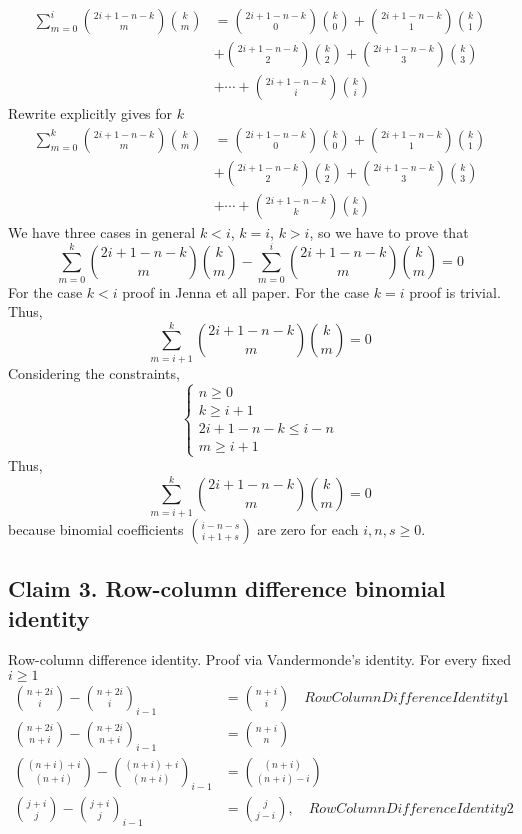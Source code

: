 \documentclass[12pt,letterpaper,oneside,reqno]{amsart}
\newcommand \rascalNumber [3] {\binom{#1}{#2}_{#3}}
\numberwithin{equation}{section}
\begin{document}
\begin{align*}
    \sum_{m=0}^{i} \binom{2i+1-n-k}{m} \binom{k}{m} &= \binom{2i+1-n-k}{0} \binom{k}{0} + \binom{2i+1-n-k}{1} \binom{k}{1} \\
    &+ \binom{2i+1-n-k}{2} \binom{k}{2} + \binom{2i+1-n-k}{3} \binom{k}{3} \\
    &+ \cdots + \binom{2i+1-n-k}{i} \binom{k}{i}
\end{align*}
Rewrite explicitly gives for $k$
\begin{align*}
    \sum_{m=0}^{k} \binom{2i+1-n-k}{m} \binom{k}{m} &= \binom{2i+1-n-k}{0} \binom{k}{0} + \binom{2i+1-n-k}{1} \binom{k}{1} \\
    &+ \binom{2i+1-n-k}{2} \binom{k}{2} + \binom{2i+1-n-k}{3} \binom{k}{3} \\
    &+ \cdots + \binom{2i+1-n-k}{k} \binom{k}{k}
\end{align*}
We have three cases in general $k < i$, $k=i$, $k > i$, so we have to prove that
\begin{equation*}
    \sum_{m=0}^{k} \binom{2i+1-n-k}{m} \binom{k}{m} - \sum_{m=0}^{i} \binom{2i+1-n-k}{m} \binom{k}{m} = 0
\end{equation*}
For the case $k < i$ proof in Jenna et all paper.
For the case $k=i$ proof is trivial.
Thus,
\begin{equation*}
    \sum_{m=i+1}^{k} \binom{2i+1-n-k}{m} \binom{k}{m} = 0
\end{equation*}
Considering the constraints,
\begin{equation*}
    \begin{cases}
        n \geq 0 \\
        k \geq i+1 \\
        2i+1-n-k \leq i-n \\
        m \geq i+1
    \end{cases}
\end{equation*}
Thus,
\begin{equation*}
    \sum_{m=i+1}^{k} \binom{2i+1-n-k}{m} \binom{k}{m} = 0
\end{equation*}
because binomial coefficients $\binom{i-n-s}{i+1+s}$ are zero for each $i, n, s \geq 0$.

\subsection{Claim 3. Row-column difference binomial identity} Row-column difference identity.
Proof via Vandermonde's identity.
For every fixed $i \geq 1$
\begin{align*}
    \binom{n+2i}{i} - \rascalNumber{n+2i}{i}{i-1} &= \binom{n+i}{i} \quad RowColumnDifferenceIdentity1 \\
    \binom{n+2i}{n+i} - \rascalNumber{n+2i}{n+i}{i-1} &= \binom{n+i}{n} \\
    \binom{(n+i)+i}{(n+i)} - \rascalNumber{(n+i)+i}{(n+i)}{i-1} &= \binom{(n+i)}{(n+i)-i} \\
    \binom{j+i}{j} - \rascalNumber{j+i}{j}{i-1} &= \binom{j}{j-i}, \quad RowColumnDifferenceIdentity2 \\
\end{align*}
\end{document}
